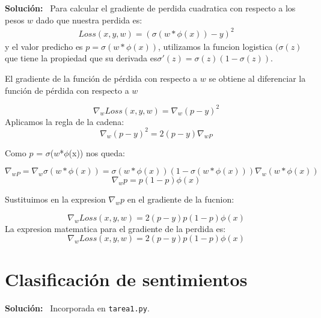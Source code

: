 \documentclass[11pt,letterpaper]{article}
\newenvironment{solution}{%
  \noindent\begin{shaded}
  \textbf{Solución:}\ }{
  \end{shaded}%
}
\begin{document}
\begin{enumerate}
  \begin{solution}
    Para calcular el gradiente de perdida cuadratica con respecto a los pesos \(w\) dado que nuestra perdida es:
     \[
  \begin{aligned}
    Loss(x,y,w) = (\sigma(w * \phi(x)) - y)^2
  \end{aligned}
  \]
y el valor predicho es \(p = \sigma(w * \phi(x))\), utilizamos la funcion logistica \((\sigma(z)\) que tiene la propiedad que su derivada es\(\sigma'(z) = \sigma(z)(1 - \sigma(z))\).

El gradiente de la función de pérdida con respecto a \(w\) se obtiene al diferenciar la función de pérdida con respecto a \(w\)

\[\nabla_w Loss(x,y,w) = \nabla_w(p-y)^2\]
Aplicamos la regla de la cadena:
\[\nabla_w(p-y)^2 = 2(p-y)\nabla_{wP}\]

Como \(p\) = \(\sigma\)(\(w\)*\(\phi\)(x)) nos queda:

\[\nabla_{wP} = \nabla_w\sigma(w * \phi(x)) = \sigma(w * \phi(x))(1 - \sigma(w * \phi(x))) \nabla_w(w * \phi(x))\]
\[\nabla_wp = p(1-p)\phi(x)\]

Sustituimos en la expresion \(\nabla_wp\) en el gradiente de la fucnion:

\[\nabla_wLoss(x,y,w) = 2(p - y)p(1-p) \phi(x)\]
La expresion matematica para el gradiente de la perdida es:
\[\nabla_wLoss(x,y,w) = 2(p - y)p(1-p) \phi(x)\]

  \end{solution}

\section*{Clasificación de sentimientos    }
\begin{solution}
  Incorporada en \texttt{tarea1.py}.
\end{solution}
\end{enumerate}
\end{document}
